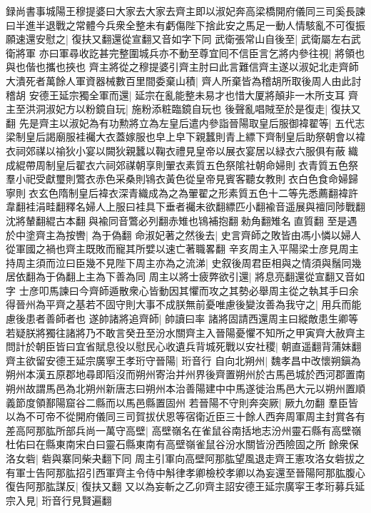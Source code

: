 録尚書事城陽王穆提婆曰大家去大家去齊主即以淑妃奔高梁橋開府儀同三司奚長諫曰半進半退戰之常體今兵衆全整未有虧傷陛下捨此安之馬足一動人情駭亂不可復振願速還安慰之|{
	復扶又翻還從宣翻又音如字下同}
武衛張常山自後至|{
	武衛屬左右武衛將軍}
亦曰軍尋收訖甚完整圍城兵亦不動至尊宜囘不信臣言乞將内參往視|{
	將領也與也偕也攜也挾也}
齊主將從之穆提婆引齊主肘曰此言難信齊主遂以淑妃北走齊師大潰死者萬餘人軍資器械數百里間委棄山積|{
	齊人所棄皆為稽胡所取後周人由此討稽胡}
安德王延宗獨全軍而還|{
	延宗在亂能整未易才也惜大厦將顛非一木所支耳}
齊主至洪洞淑妃方以粉鏡自玩|{
	施粉添粧臨鏡自玩也}
後聲亂唱賊至於是復走|{
	復扶又翻}
先是齊主以淑妃為有功勲將立為左皇后遣内參詣晉陽取皇后服御褘翟等|{
	五代志梁制皇后謁廟服袿䙱大衣蓋嫁服也皁上皁下親蠶則青上縹下齊制皇后助祭朝會以褘衣祠郊禖以䄖狄小宴以闕狄親蠶以鞠衣禮見皇帝以展衣宴居以緑衣六服俱有蔽織成緄帶周制皇后翟衣六祠郊禖朝享則翬衣素質五色祭隂社朝命婦則衣青質五色祭羣小祀受獻璽則鷩衣赤色采桑則鴇衣黃色從皇帝見賓客聽女教則衣白色食命婦歸寧則衣玄色隋制皇后褘衣深青織成為之為翬翟之形素質五色十二等先悉薦翻褘許韋翻袿涓畦翻釋名婦人上服曰袿具下垂者䙱未欲翻縹匹小翻褕音遥展與襢同陟戰翻沈將輦翻緄古本翻與褕同音鷩必列翻赤雉也鴇補抱翻勑角翻雉名直質翻}
至是遇於中塗齊主為按轡|{
	為于偽翻}
命淑妃著之然後去|{
	史言齊師之敗皆由馮小憐以婦人從軍國之禍也齊主既敗而寵其所嬖以速亡著職畧翻}
辛亥周主入平陽梁士彦見周主持周主須而泣曰臣幾不見陛下周主亦為之流涕|{
	史叙後周君臣相與之情須與鬚同幾居依翻為于偽翻上主為下善為同}
周主以將士疲弊欲引還|{
	將息亮翻還從宣翻又音如字}
士彦叩馬諫曰今齊師遁散衆心皆動因其懼而攻之其勢必舉周主從之執其手曰余得晉州為平齊之基若不固守則大事不成朕無前憂唯慮後變汝善為我守之|{
	用兵而能慮後患者善師者也}
遂帥諸將追齊師|{
	帥讀曰率}
諸將固請西還周主曰縱敵患生卿等若疑朕將獨往諸將乃不敢言癸丑至汾水關齊主入晉陽憂懼不知所之甲寅齊大赦齊主問計於朝臣皆曰宜省賦息役以慰民心收遺兵背城死戰以安社稷|{
	朝直遥翻背蒲妹翻}
齊主欲留安德王延宗廣寧王孝珩守晉陽|{
	珩音行}
自向北朔州|{
	魏孝昌中改懷朔鎭為朔州本漢五原郡地尋即䧟沒而朔州寄治并州界後齊置朔州於古馬邑城於西河郡置南朔州故謂馬邑為北朔州新唐志曰朔州本治善陽建中中馬遂徙治馬邑大元以朔州置順義節度領鄯陽窟谷二縣而以馬邑縣置固州}
若晉陽不守則奔突厥|{
	厥九勿翻}
羣臣皆以為不可帝不從開府儀同三司賀拔伏恩等宿衛近臣三十餘人西奔周軍周主封賞各有差高阿那肱所部兵尚一萬守高壁|{
	高壁嶺名在雀鼠谷南括地志汾州靈石縣有高壁嶺杜佑曰在縣東南宋白曰靈石縣東南有高壁嶺雀鼠谷汾水關皆汾西險固之所}
餘衆保洛女砦|{
	砦與寨同柴夬翻下同}
周主引軍向高壁阿那肱望風退走齊王憲攻洛女砦拔之有軍士告阿那肱招引西軍齊主令侍中斛律孝卿檢校孝卿以為妄還至晉陽阿那肱腹心復告阿那肱謀反|{
	復扶又翻}
又以為妄斬之乙卯齊主詔安德王延宗廣寜王孝珩募兵延宗入見|{
	珩音行見賢遍翻}
